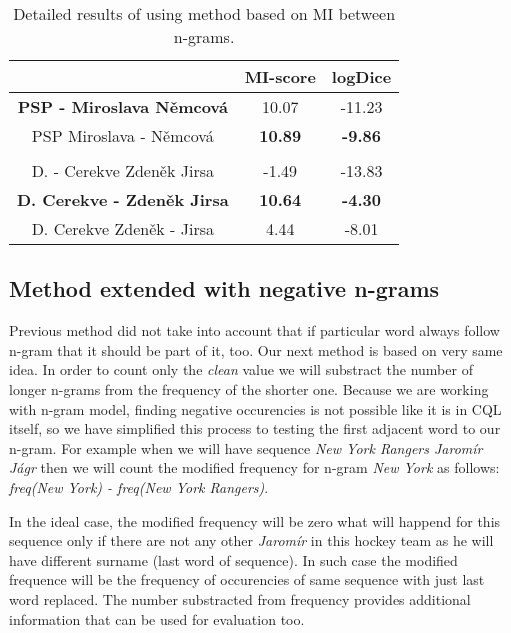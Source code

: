 \documentclass[runningheads]{llncs}
\begin{document}
\begin{table}[h] 
\caption{Detailed results of using method based on MI between n-grams. }
\label{mutual-n-gram}
\begin{center} \begin{tabular}{|c|c|c|} \hline
 & MI-score & logDice\\ \hline
{\bf PSP - Miroslava N\v{e}mcov\'{a}} & 10.07 & -11.23 \\ \hline
PSP Miroslava - N\v{e}mcov\'{a} & {\bf 10.89} & {\bf -9.86} \\ \hline
& & \\ \hline
D. - Cerekve Zden\v{e}k Jirsa & -1.49 & -13.83 \\ \hline
{\bf D. Cerekve - Zden\v{e}k Jirsa} & {\bf 10.64} & {\bf -4.30} \\ \hline
D. Cerekve Zden\v{e}k - Jirsa & 4.44 & -8.01 \\ \hline
\end{tabular} \end{center} \end{table}

\subsection{Method extended with negative n-grams}

Previous method did not take into account that if particular word always
follow n-gram that it should be part of it, too. Our next method is based on
very same idea. In order to count only the {\em clean} value we will
substract the number of longer n-grams from the frequency of the shorter
one.  Because we are working with n-gram model, finding negative occurencies is
not possible like it is in CQL itself, so we have simplified this process to
testing the first adjacent word to our n-gram. 
For example when we will have sequence {\em New York Rangers Jarom\'{i}r
J\'{a}gr} then we will count the modified frequency for n-gram {\em New York} as follows:
{\em freq(New York) - freq(New York Rangers)}.

In the ideal case, the modified frequency will be zero what will happend for
this sequence only if there are not any other {\em Jarom\'{i}r} in this
hockey team as he will have different surname (last word of sequence).  In
such case the modified frequence will be the frequency of occurencies of
same sequence with just last word replaced.  The number substracted from
frequency provides additional information that can be used for evaluation
too.
\end{document}
